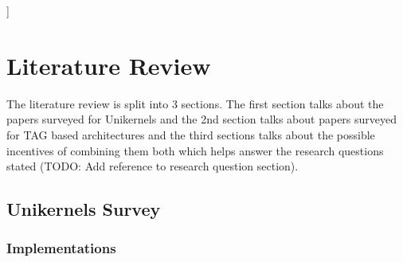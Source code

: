 ]%

\chapter{Literature Review}  %

\ifpdf
    \graphicspath{{LiteratureReview/Figs/Raster/}{LiteratureReview/Figs/PDF/}{LiteratureReview/Figs/}}
\else
    \graphicspath{{LiteratureReview/Figs/Vector/}{LiteratureReview/Figs/}}
\fi


The literature review is split into 3 sections. The first section talks about the papers surveyed 
for Unikernels and the 2nd section talks about papers surveyed for TAG based architectures and 
the third sections talks about the possible incentives of combining them both which helps 
answer the research questions stated (TODO: Add reference to research question section). 

\section[Unikernels]{Unikernels Survey}

\subsection{Implementations}

